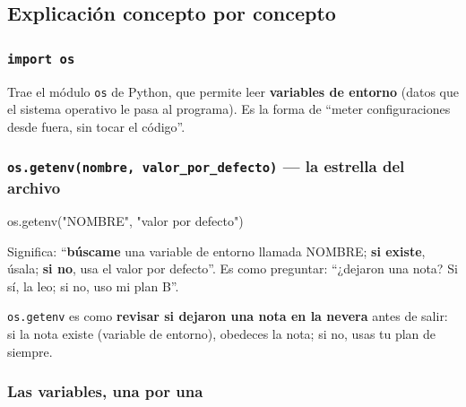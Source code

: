 \documentclass[11pt,a4paper]{article}
\begin{document}
\subsection{Explicación concepto por concepto}

\subsubsection{\texttt{import os}}

Trae el módulo \texttt{os} de Python, que permite leer \textbf{variables de entorno}
(datos que el sistema operativo le pasa al programa). Es la forma de ``meter configuraciones
desde fuera, sin tocar el código''.

\subsubsection{\texttt{os.getenv(nombre, valor\_por\_defecto)} --- la estrella del archivo}

\begin{center}
\colorbox{fondocodigo}{\parbox{0.92\textwidth}{\ttfamily\small
os.getenv("NOMBRE", "valor por defecto")
}}
\end{center}

Significa: ``\textbf{búscame} una variable de entorno llamada NOMBRE; \textbf{si existe}, úsala;
\textbf{si no}, usa el valor por defecto''. Es como preguntar: ``¿dejaron una nota? Si sí, la leo;
si no, uso mi plan B''.

\begin{analogia}
\texttt{os.getenv} es como \textbf{revisar si dejaron una nota en la nevera} antes de salir:
si la nota existe (variable de entorno), obedeces la nota; si no, usas tu plan de siempre.
\end{analogia}

\subsubsection{Las variables, una por una}
\end{document}
